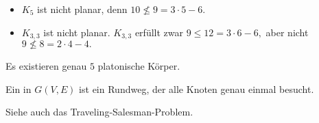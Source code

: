 \begin{ex}
    \begin{itemize}
        \item
            $K_5$ ist nicht planar, denn
            \begin{math}
                10 \not\le 9 = 3\cdot 5 - 6.
            \end{math}
        \item
            $K_{3,3}$ ist nicht planar.
            $K_{3,3}$ erfüllt zwar
            \begin{math}
                9 \le 12 = 3 \cdot 6 - 6,
            \end{math}
            aber nicht
            \begin{math}
                9 \not\le 8 = 2 \cdot 4 - 4.
            \end{math}
    \end{itemize}
\end{ex}

\begin{st}
    Es existieren genau $5$ platonische Körper.
\end{st}

\begin{df}
    Ein  in $G(V, E)$ ist ein Rundweg, der alle Knoten genau einmal besucht.
    \begin{note}
        Siehe auch das Traveling-Salesman-Problem.
    \end{note}
\end{df}





